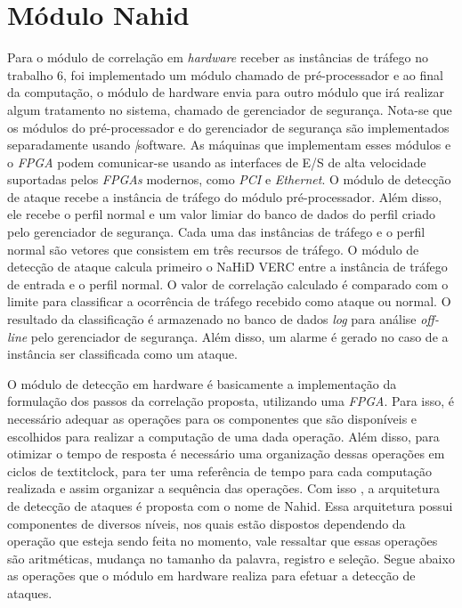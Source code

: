 \chapter{Módulo Nahid}
\label{CAP3}

Para o módulo de correlação em \textit{hardware} receber as instâncias de tráfego no trabalho {6}, foi implementado  um módulo  chamado de pré-processador e ao final da computação, o módulo de hardware envia para outro módulo que irá realizar algum tratamento no sistema, chamado de gerenciador de segurança. Nota-se que os módulos do pré-processador e do gerenciador de segurança são implementados separadamente usando \textit|{software}. As máquinas que implementam esses módulos e o \textit{FPGA} podem comunicar-se usando as interfaces de E/S de alta velocidade suportadas pelos \textit{FPGAs} modernos, como \textit{PCI} e \textit{Ethernet}. O módulo de detecção de ataque recebe a instância de tráfego do módulo pré-processador. Além disso, ele recebe o perfil normal e um valor limiar do banco de dados do perfil criado pelo gerenciador de segurança. Cada uma das instâncias de tráfego e o perfil normal são vetores que consistem em três recursos de tráfego. O módulo de detecção de ataque calcula primeiro o NaHiD VERC entre a instância de tráfego de entrada e o perfil normal. O valor de correlação calculado é comparado com o limite para classificar a ocorrência de tráfego recebido como ataque ou normal. O resultado da classificação é armazenado no banco de dados \textit{log} para análise \textit{off-line} pelo gerenciador de segurança. Além disso, um alarme é gerado no caso de a instância ser classificada como um ataque.

O  módulo de detecção em hardware é basicamente a implementação da formulação dos passos da correlação proposta, utilizando uma \textit{FPGA}. Para isso, é necessário adequar  as operações para os componentes que são disponíveis e escolhidos para realizar a computação de uma dada operação.  Além disso, para otimizar o tempo de resposta é necessário uma organização dessas operações em ciclos de textit{clock}, para ter uma referência de tempo  para cada computação realizada e assim organizar a sequência das operações. Com isso , a arquitetura de detecção de ataques é proposta com o nome de Nahid. Essa arquitetura possui componentes de diversos níveis, nos quais estão dispostos dependendo da operação que esteja sendo feita no momento, vale ressaltar que essas operações são aritméticas, mudança no tamanho da palavra, registro e seleção. Segue abaixo as operações que o módulo em hardware realiza para efetuar a detecção de ataques.


